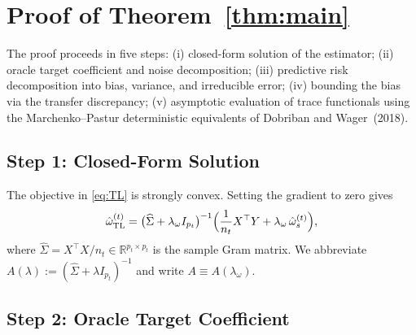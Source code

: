 \documentclass[11pt]{article}
\theoremstyle{definition}
\newcommand{\hSig}{\widehat{\Sigma}}
\newcommand{\ohat}{\hat{\omega}}
\newcommand{\R}{\mathbb{R}}
\begin{document}
\section{Proof of Theorem~\ref{thm:main}}\label{sec:proof}
 
The proof proceeds in five steps:
(i) closed-form solution of the estimator;
(ii) oracle target coefficient and noise decomposition;
(iii) predictive risk decomposition into bias, variance, and irreducible
error;
(iv) bounding the bias via the transfer discrepancy;
(v) asymptotic evaluation of trace functionals using the
Marchenko--Pastur deterministic equivalents of
Dobriban and Wager~(2018).
 
\subsection{Step 1: Closed-Form Solution}\label{sec:step1}
 
The objective in \eqref{eq:TL} is strongly convex.  Setting the
gradient to zero gives
\begin{equation}\label{eq:closed}
  \ohat_{\mathrm{TL}}^{(t)}
  =\bigl(\hSig+\lambda_\omega I_{p_t}\bigr)^{-1}
  \Bigl(\frac{1}{n_t}X^\top Y+\lambda_\omega\,\ohat_s^{(t)}\Bigr),
\end{equation}
where $\hSig=X^\top X/n_t\in\R^{p_t\times p_t}$ is the sample Gram
matrix.  We abbreviate $A(\lambda):=(\hSig+\lambda I_{p_t})^{-1}$ and
write $A\equiv A(\lambda_\omega)$.
 
\subsection{Step 2: Oracle Target Coefficient}\label{sec:step2}
 
\end{document}
